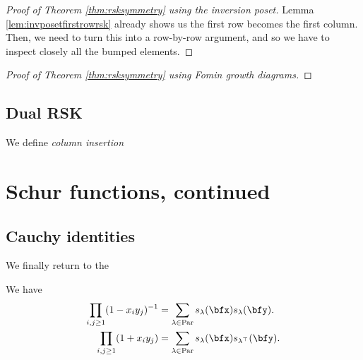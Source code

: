 \documentclass{article}
\DeclareMathOperator{\Par}{Par}
\begin{document}
\begin{proof}[Proof of Theorem \ref{thm:rsksymmetry} using the inversion poset]

    Lemma \ref{lem:invposetfirstrowrsk} already shows us the first row becomes the first column.
    Then, we need to turn this into a row-by-row argument, and so we have to inspect closely all the bumped elements.
    

\end{proof}

\begin{proof}[Proof of Theorem \ref{thm:rsksymmetry} using Fomin growth diagrams]
\end{proof}

\subsection{Dual RSK}

\begin{definition}
    We define \textit{column insertion}
\end{definition}

\section{Schur functions, continued}

\subsection{Cauchy identities}
We finally return to the 

\begin{theorem}
    We have
    \begin{align}
        \label{eq:CauchyIdentityForSchurs}
        \prod_{i,j \geq 1}(1-x_iy_j)^{-1}
        &=
        \sum_{\lambda\in\Par}
        s_\lambda(\bfx)s_\lambda(\bfy).
        \\
        \prod_{i,j \geq 1}(1+x_iy_j)
        &=
        \sum_{\lambda\in\Par}
        s_\lambda(\bfx)s_{\lambda^\top}(\bfy).
    \end{align}
\end{theorem}
\end{document}
